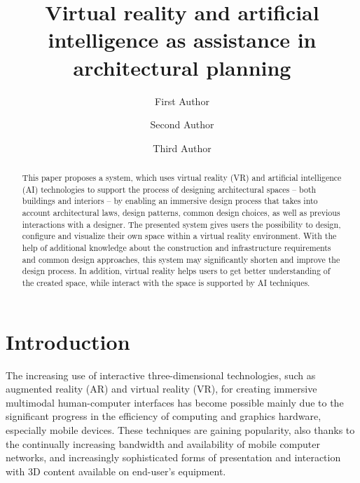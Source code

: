 \documentclass[runningheads]{llncs}
\begin{document}
%
\title{Virtual reality and artificial intelligence as assistance in architectural planning}
%
%
\author{First Author \and
Second Author \and
Third Author}
%
%
%
\maketitle              %
%
\begin{abstract}
This paper proposes a system, which uses virtual reality (VR) and artificial intelligence (AI) technologies to support the process of designing architectural spaces -- both buildings and interiors -- by enabling an immersive design process that takes into account architectural laws, design patterns, common design choices, as well as previous interactions with a designer. The presented system gives users the possibility to design, configure and visualize their own space within a virtual reality environment. With the help of additional knowledge about the construction and infrastructure requirements and common design approaches, this system may significantly shorten and improve the design process. In addition, virtual reality helps users to get better understanding of the created space, while interact with the space is supported by AI techniques.

\end{abstract}
%
%
%
\section{Introduction}
The increasing use of interactive three-dimensional technologies, such as augmented reality (AR) and virtual reality (VR), for creating immersive multimodal human-computer interfaces has become possible mainly due to the significant progress in the efficiency of computing and graphics hardware, especially mobile devices. These techniques are gaining popularity, also thanks to the continually increasing bandwidth and availability of mobile computer networks, and increasingly sophisticated forms of presentation and interaction with 3D content available on end-user's equipment.
\end{document}
